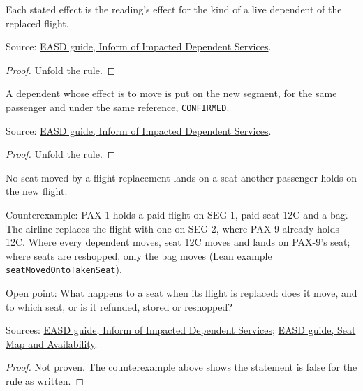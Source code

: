 \begin{theorem}
  \label{thm:ancillaries-replace-effect-by-kind}
  Each stated effect is the reading's effect for the kind of a live
  dependent of the replaced flight.

  Source: \href{https://standards.atlassian.net/wiki/spaces/EASD/pages/672825400}{EASD guide, Inform of Impacted Dependent Services}.
\end{theorem}
\begin{proof}
  Unfold the rule.
\end{proof}

\begin{theorem}
  \label{thm:ancillaries-replace-moves}
  A dependent whose effect is to move is put on the new segment, for the
  same passenger and under the same reference, \texttt{CONFIRMED}.

  Source: \href{https://standards.atlassian.net/wiki/spaces/EASD/pages/672825400}{EASD guide, Inform of Impacted Dependent Services}.
\end{theorem}
\begin{proof}
  Unfold the rule.
\end{proof}

\begin{theorem}
  \label{thm:ancillaries-replace-no-seat-clash}
  No seat moved by a flight replacement lands on a seat another passenger
  holds on the new flight.

  Counterexample: PAX-1 holds a paid flight on SEG-1, paid seat 12C and a
  bag.  The airline replaces the flight with one on SEG-2, where PAX-9
  already holds 12C.  Where every dependent moves, seat 12C moves and lands
  on PAX-9's seat; where seats are reshopped, only the bag moves (Lean
  example \texttt{seatMovedOntoTakenSeat}).

  Open point: What happens to a seat when its flight is replaced: does it
  move, and to which seat, or is it refunded, stored or reshopped?

  Sources: \href{https://standards.atlassian.net/wiki/spaces/EASD/pages/672825400}{EASD guide, Inform of Impacted Dependent Services};
  \href{https://standards.atlassian.net/wiki/spaces/EASD/pages/574586953}{EASD guide, Seat Map and Availability}.
\end{theorem}
\begin{proof}
  Not proven.  The counterexample above shows the statement is false for the
  rule as written.
\end{proof}

